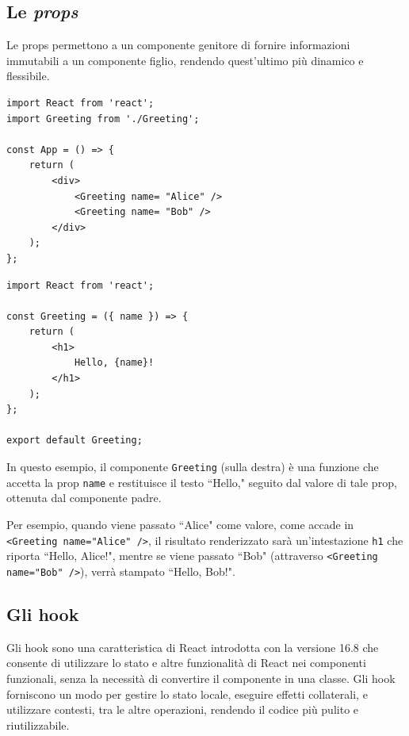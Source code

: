 \documentclass[target=bach,aauheader=,style=]{thud}
\begin{document}
\subsection{Le \textit{props}}
Le props permettono a un componente genitore di fornire informazioni immutabili a un componente figlio, rendendo quest'ultimo più dinamico e flessibile.

\begin{minipage}[t]{0.45\textwidth}
    \begin{lstlisting}[caption=Componente padre]
import React from 'react';
import Greeting from './Greeting';

const App = () => {
    return (
        <div>
            <Greeting name= "Alice" />
            <Greeting name= "Bob" />
        </div>
    );
};  
    \end{lstlisting}
\end{minipage}
\hfill
\begin{minipage}[t]{0.45\textwidth}
    \begin{lstlisting}[caption=Componente figlio]
import React from 'react';

const Greeting = ({ name }) => {
    return (
        <h1>
            Hello, {name}!
        </h1>
    );
};

export default Greeting;
    \end{lstlisting}
\end{minipage}

\noindent In questo esempio, il componente \texttt{Greeting} (sulla destra) è una funzione che accetta la prop \texttt{name} e restituisce il testo  ``Hello," seguito dal valore di tale prop, ottenuta dal componente padre. 

\noindent Per esempio, quando viene passato ``Alice" come valore, come accade in \texttt{<Greeting name="Alice" />}, il risultato renderizzato sarà un'intestazione \texttt{h1} che riporta ``Hello, Alice!", mentre se viene passato ``Bob" (attraverso \texttt{<Greeting name="Bob" />}), verrà stampato ``Hello, Bob!".

\subsection{Gli hook}
Gli hook sono una caratteristica di React introdotta con la versione 16.8 che consente di utilizzare lo stato e altre funzionalità di React nei componenti funzionali, senza la necessità di convertire il componente in una classe. Gli hook forniscono un modo per gestire lo stato locale, eseguire effetti collaterali, e utilizzare contesti, tra le altre operazioni, rendendo il codice più pulito e riutilizzabile. 
\end{document}
